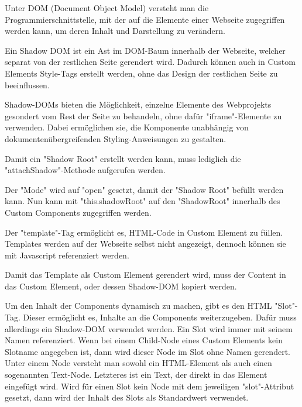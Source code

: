 \pagebreak
{}

Unter DOM (Document Object Model) versteht man die Programmierschnittstelle, mit der auf die Elemente einer Webseite zugegriffen werden kann, um deren Inhalt und Darstellung zu verändern. \cite{MDNDOM}

Ein Shadow DOM ist ein Ast im DOM-Baum innerhalb der Webseite, welcher separat von der restlichen Seite gerendert wird.
Dadurch können auch in Custom Elements Style-Tags erstellt werden, ohne das Design der restlichen Seite zu beeinflussen. \cite{MDNShadowRoot}

Shadow-DOMs bieten die Möglichkeit, einzelne Elemente des Webprojekts gesondert vom Rest der Seite zu behandeln, ohne dafür "{\ttfamily iframe}"-Elemente zu verwenden. 
Dabei ermöglichen sie, die Komponente unabhängig von dokumentenübergreifenden Styling-Anweisungen zu gestalten. \cite{IONOSShadowDom}

Damit ein "Shadow Root" erstellt werden kann, muss lediglich die "{\ttfamily attachShadow}"-Methode aufgerufen werden. \cite{MDNShadowRoot}


Der "Mode" wird auf "{\ttfamily open}" gesetzt, damit der "Shadow Root" befüllt werden kann. Nun kann mit "{\ttfamily this.shadowRoot}" auf den "ShadowRoot" innerhalb des Custom Components zugegriffen werden.
\cite{MDNShadowRoot}

\pagebreak
{}

Der "template"-Tag ermöglicht es, HTML-Code in Custom Element zu füllen.
Templates werden auf der Webseite selbst nicht angezeigt, dennoch können sie mit Javascript referenziert werden. \cite{MDNtemplate}


Damit das Template als Custom Element gerendert wird, muss der Content in das Custom Element, oder dessen Shadow-DOM kopiert werden.



Um den Inhalt der Components dynamisch zu machen, gibt es den HTML "Slot"-Tag. 
Dieser ermöglicht es, Inhalte an die Components weiterzugeben. 
Dafür muss allerdings ein Shadow-DOM verwendet werden. 
Ein Slot wird immer mit seinem Namen referenziert. 
Wenn bei einem Child-Node eines Custom Elements kein Slotname angegeben ist, dann wird dieser Node im Slot ohne Namen gerendert. 
Unter einem Node versteht man sowohl ein HTML-Element als auch einen sogenannten Text-Node. 
Letzteres ist ein Text, der direkt in das Element eingefügt wird. 
Wird für einen Slot kein Node mit dem jeweiligen "{\ttfamily slot}"-Attribut gesetzt, dann wird der Inhalt des Slots als Standardwert verwendet. 
\cite{MDNSlots}

